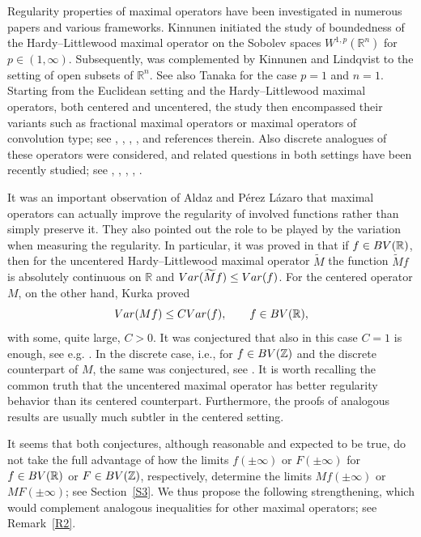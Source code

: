 \documentclass[leqno,11pt]{amsart}
\numberwithin{equation}{section}
\numberwithin{theorem}{section}
\newcommand{\RR}{\mathbb{R}}
\newcommand{\ZZ}{\mathbb{Z}}
\newcommand{\Var}{{\rm Var}}
\newcommand{\BV}{{\rm BV}}
\begin{document}
	Regularity properties of maximal operators have been investigated in numerous papers and various frameworks. Kinnunen \cite{Kinnunen1997} initiated the study
	of boundedness of the Hardy--Littlewood maximal operator on the Sobolev spaces $W^{1,p}(\RR^n)$ for $p \in (1,\infty)$. Subsequently, \cite{Kinnunen1997} was complemented
	by Kinnunen and Lindqvist \cite{KiLi1998} to the setting of open subsets of $\RR^n$. See also Tanaka \cite{Tanaka2002} for the case $p=1$ and $n=1$.
	Starting from the Euclidean setting and the Hardy--Littlewood maximal operators, both centered and uncentered, the study then encompassed their variants
	such as fractional maximal operators or maximal operators of convolution type; see \cite{CS2013}, \cite{CMP2017}, \cite{Liu2017}, \cite{M2017}, and references therein.
	Also discrete analogues of these operators were considered, and related questions in both settings have been recently studied; see \cite{M2019}, \cite{GRK2021}, \cite{CGRM2022}, \cite{BGRMW2023}, \cite{GR2023}.
	
	It was an important observation of Aldaz and P{\'e}rez L{\'a}zaro \cite{AP2007} that maximal operators can actually improve the regularity of involved 
	functions rather than simply preserve it. They also pointed out the role to be played by the variation when measuring the regularity. 
	In particular, it was proved in \cite{AP2007} that if $f\in\BV(\RR)$, then for the uncentered Hardy--Littlewood maximal operator $\widetilde{M}$ 
	the function $\widetilde{M}f$ is absolutely continuous on $\RR$ and $\Var(\widetilde{M}f)\le \Var(f)$. For the centered operator $M$, on the other hand, Kurka \cite{Kurka2010} proved
	\[
	\Var(Mf)\le C\Var(f), \qquad f\in\BV(\RR),
	\]
	with some, quite large, $C>0$. It was conjectured that also in this case $C=1$ is enough, see e.g. \cite[Section~1]{Kurka2010}. In the discrete case, 
	i.e., for $f\in\BV(\ZZ)$ and the discrete counterpart of $M$, 
	the same was conjectured, see \cite[Question~B]{BCHP2012}. It is worth recalling the common truth that the  uncentered maximal operator has better 
	regularity behavior than its centered counterpart. Furthermore, the proofs of analogous results are usually much subtler in the centered setting. 
	
	It seems that both conjectures, although reasonable and expected to be true, do not take the full advantage of how the limits $f(\pm\infty)$ or $F(\pm\infty)$ 
	for $f\in\BV(\RR)$ or $F\in\BV(\ZZ)$, respectively, determine the limits $Mf(\pm \infty)$ or $MF(\pm \infty)$; see Section~\ref{S3}. We thus propose the following strengthening, which would complement analogous inequalities for other maximal operators; see Remark~\ref{R2}. 
		
\end{document}
